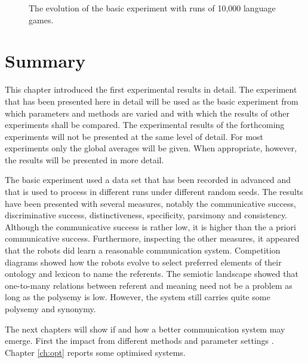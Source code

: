 \begin{figure}[p]
\caption{The evolution of the basic experiment with runs of 10,000 language games.}
\label{f:st:10000}
\end{figure}


\section{Summary}\label{basic:summary}

This chapter introduced the first experimental results in detail. The experiment that has been presented here in detail will be used as the basic experiment from which parameters and methods are varied and with which the results of other experiments shall be compared. The experimental results of the forthcoming experiments will not be presented at the same level of detail. For most experiments only the global averages will be given. When appropriate, however, the results will be presented in more detail. 

The basic experiment used a data set that has been recorded in advanced  and that is used to process in different runs under different random seeds. The results have been presented with several measures, notably the communicative success, discriminative success, distinctiveness, specificity, parsimony and consistency. Although the communicative success is rather low, it is higher than the a priori communicative success. Furthermore, inspecting the other measures, it appeared that the robots did learn a reasonable communication system. Competition diagrams showed how the robots evolve to select preferred elements of their ontology and lexicon to name the referents. The semiotic landscape showed that one-to-many relations between referent and meaning need not be a problem as long as the polysemy is low.  However, the system still carries quite some polysemy and synonymy. 

The next chapters will show if and how a better communication system may emerge. First the impact from different methods and parameter settings . Chapter \ref{ch:opt} reports some optimised systems.